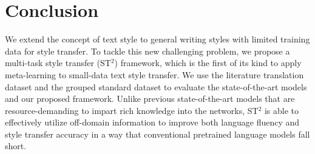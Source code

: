\section{Conclusion}
\label{sec:conclude}

We extend the concept of text style to general writing styles 
with limited training data for style transfer. To tackle this new challenging problem, we propose a multi-task style transfer (ST$^2$) framework, which is the first of its kind to apply meta-learning to small-data text style transfer. We use the literature translation dataset and the grouped standard dataset to evaluate the state-of-the-art models and our proposed framework. Unlike previous state-of-the-art models that are resource-demanding to impart rich knowledge into the networks, ST$^2$ is able to effectively utilize off-domain information to improve both language fluency and style transfer accuracy in a way that conventional 
pretrained language models fall short.

